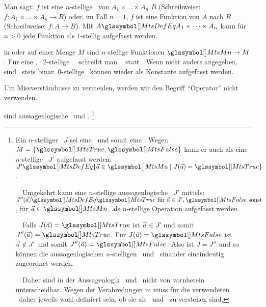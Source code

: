 \begin{description}
	Man sagt: $f$ ist eine $n$-stellige \Funktion\ von $A_1 \times \dots \times A_n$  $B$ (Schreibweise: $f : A_1 \times \dots \times A_n \rightarrow B$) oder, im Fall $n=1$, $f$ ist eine Funktion von $A$ nach $B$ (Schreibweise: $f : A \rightarrow B$).
	Mit $A \MtsDefEq A_1 \times \dots \times A_n$ kann für $n > 0$ jede Funktion als $1$-stellig aufgefasst werden.

	\item [\Operationen] in oder auf einer Menge $M$ sind $n$-stellige Funktionen $\MtsMn \rightarrow M$.
	Für eine , \textdh\ 2-stellige \Operation\ \BspOpB\ schreibt man \textiAlg\  statt .
	Wenn nicht anders angegeben, sind \Operationen\ stets binär.
	0-stellige \Operationen\ können wieder als Konstante aufgefasst werden.

	Um Missverständnisse zu vermeiden, werden wir den Begriff "`Operator"' nicht verwenden.

	\item [\Junktoren] sind aussagenlogische \Relationen\ und \Operationen.%
	\footnote{\label{def-Junktor}%
		Ein $n$-stelliger \Junktor\ $J$ sei eine \Operation\ und somit eine \Funktion.
		Wegen $M = \{\MtsTrue,\MtsFalse\}$ kann er auch als eine $n$-stellige \Relation\ $J'$ aufgefasst werden:
		$J' \MtsDefEq \{\vec{a} \in \MtsMn \mid J(\vec{a}) = \MtsTrue\}$.

		~~Umgekehrt kann eine $n$-stellige aussagenlogische \Relation\ $J'$ mittels:
		$J''(\vec{a}) \MtsDefEq \MtsTrue \text{ für } \vec{a} \in J', \MtsFalse \text{ sonst}$, für $\vec{a} \in \MtsMn$, als $n$-stellige Operation aufgefasst werden.

		~~Falls $J(\vec{a})=\MtsTrue$ ist $\vec{a} \in J'$ und somit $J''(\vec{a})=\MtsTrue$.
		Für $J(\vec{a})=\MtsFalse$ ist $\vec{a} \notin J'$ und somit $J''(\vec{a})=\MtsFalse$.
		Also ist $J=J''$ und so können die aussagenlogischen $n$-stelligen \Relationen\ und \Operationen\ einander eineindeutig zugeordnet werden.

		~~Daher sind in der Aussagenlogik \Relationen\ und \Operationen\ nicht von vornherein unterscheidbar.
		Wegen der Verabredungen in  muss für die verwendeten \Junktoren\ daher jeweils wohl definiert sein, ob sie als \Relation\ und \Operation\ zu verstehen sind.
	}
\end{description}

